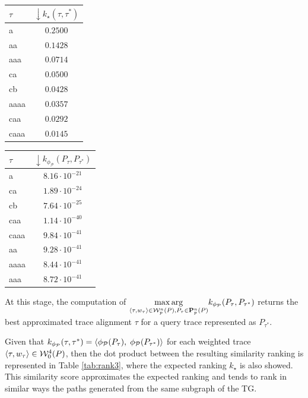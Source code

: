 \begin{table}[!t]
{\begin{tabular}{l|c}
	{$\tau$} &
	{$\boldsymbol{\downarrow}k_\star(\tau,\tau^*)$} \\
	
	
	\midrule
	{a}  &  $0.2500$ \\
	{aa}  &  $0.1428$  \\
	{aaa}  & $0.0714$ \\
	{ca}  &   $0.0500$\\
	{cb}  & $0.0428$ \\
	{aaaa}  &  $0.0357$ \\
	{caa}  &  $0.0292$ \\
	{caaa}  &   $0.0145$ \\
	\bottomrule
\end{tabular}\quad	\begin{tabular}{l|c}
	\toprule
	
	{$\tau$} &
	{$\boldsymbol{\downarrow}k_{\phi_{\mathcal{P}}}(P_\tau,P_{\tau^*})$} \\

	
	\midrule
	{a}  & $8.16\cdot 10^{-21}$ \\
	{ca}  &   $1.89\cdot 10^{-24}$\\
	{cb}  &   $7.64\cdot 10^{-25}$\\
	{caa}  &$1.14\cdot 10^{-40}$\\
	{caaa}  &  $9.84\cdot 10^{-41}$\\
	{aa}  &  $9.28\cdot 10^{-41}$ \\
	{aaaa}  & $8.44\cdot 10^{-41}$\\
	{aaa}  &  $8.72\cdot 10^{-41}$\\
	\bottomrule
\end{tabular}}
\end{table}


At this stage, the computation of $\underset{\braket{\tau,w_\tau}\in \mathcal{W}_p^n(P), P_\tau\in\mathbf{P}_p^n(P)}{\max\arg} k_{\phi_\mathcal{P}}(P_\tau, P_{\tau^*})$ returns the best approximated trace alignment $\tau$ for a query trace represented as $P_{\tau^*}$. %

\begin{example}\label{ex:11}
	Given that $k_{\phi_{\mathcal{P}}}(\tau,\tau^*)=\braket{\phi_{\mathcal{P}}(P_\tau),\;\phi_{\mathcal{P}}(P_{\tau^*})}$ for each weighted trace $\braket{\tau,w_\tau}\in\mathcal{W}_0^4(P)$, then the dot product between the resulting similarity ranking is represented in Table \ref{tab:rank3}, where the expected ranking $k_\star$ is also showed. This similarity score approximates the expected ranking  and tends to rank in similar ways the paths generated from the same subgraph of the TG.
\end{example}


